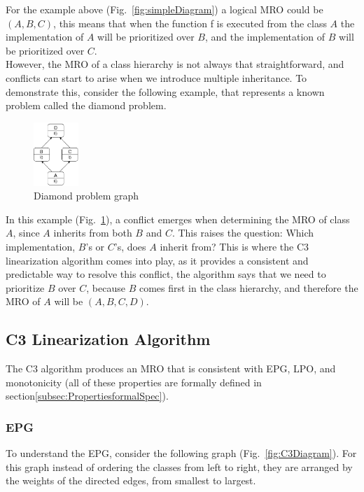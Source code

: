 \documentclass[runningheads]{llncs}
\begin{document}
For the example above (Fig.~\ref{fig:simpleDiagram}) a logical MRO could be $(A, B, C)$, this means that when the function f is executed from the class $A$ the implementation of $A$ will be prioritized over $B$, and the implementation of $B$ will be prioritized over $C$.\\
However, the MRO of a class hierarchy is not always that straightforward, and conflicts can start to arise when we introduce multiple inheritance.
To demonstrate this, consider the following example, that represents a known problem called the diamond problem\autocite{mondayezeStudiesObjectorientedProgramming2021}.
\begin{figure}[htbp]
  \centering
  \includegraphics[width=0.15\textwidth]{images/DiamondProblem.png}
  \caption{Diamond problem graph}
  \label{fig:DiamondProblem}
\end{figure}

In this example (Fig.~\ref{fig:DiamondProblem}), a conflict emerges when determining the MRO of class $A$, since $A$ inherits from both $B$ and $C$. This raises the question: Which implementation, $B$'s or $C$'s, does $A$ inherit from? 
This is where the C3 linearization algorithm comes into play, as it provides a consistent and predictable way to resolve this conflict, the algorithm says that we need to prioritize $B$ over $C$, because $B$ comes first in the class hierarchy, and therefore the MRO of $A$ will be $(A, B, C, D)$.

\subsection{C3 Linearization Algorithm}
\label{subsec:C3Linearization}
The C3 algorithm produces an MRO that is consistent with EPG, LPO, and monotonicity\autocite{barrettMonotonicSuperclassLinearization1996} (all of these properties are formally defined in section\ref{subsec:PropertiesformalSpec}).

\subsubsection{EPG}
To understand the EPG, consider the following graph (Fig.~\ref{fig:C3Diagram}). For this graph instead of ordering the classes from left to right,
 they are arranged by the weights of the directed edges, from smallest to largest.
\end{document}
